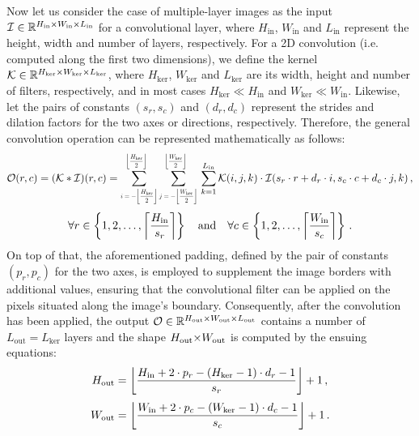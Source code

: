 Now let us consider the case of multiple-layer images as the input $\mathcal{I} \in \mathbb{R}^{H_{\text{in}} \stimes W_{\text{in}} \stimes L_{\text{in}}}$ for a convolutional layer, where $H_{\text{in}}$, $W_{\text{in}}$ and $L_{\text{in}}$ represent the height, width and number of layers, respectively. For a 2D convolution (i.e. computed along the first two dimensions), we define the kernel $\mathcal{K} \in \mathbb{R}^{H_{\text{ker}} \stimes W_{\text{ker}} \stimes L_{\text{ker}}}$, where $H_{\text{ker}}$, $W_{\text{ker}}$ and $L_{\text{ker}}$ are its width, height and number of filters, respectively, and in most cases $H_{\text{ker}} \ll H_{\text{in}}$ and $W_{\text{ker}} \ll W_{\text{in}}$. Likewise, let the pairs of constants $(s_r, s_c)$ and $(d_r, d_c)$ represent the strides and dilation factors for the two axes or directions, respectively. Therefore, the general convolution operation can be represented mathematically as follows:
\begin{equation}
    \mathcal{O}(r, c) = \left( \mathcal{K} \ast \mathcal{I} \right)\!(r, c) =
    \sum\limits_{ \scalemath{\convscale}{ i=-\floor*{\dfrac{H_{\text{ker}}}{2}} } }^{ \scalemath{\convscale}{ \floor*{\dfrac{H_{\text{ker}}}{2}} } }
    \sum\limits_{ \scalemath{\convscale}{ j=-\floor*{\dfrac{W_{\text{ker}}}{2}} } }^{ \scalemath{\convscale}{ \floor*{\dfrac{W_{\text{ker}}}{2}} } } \,
    \sum\limits_{k=1}^{L_{\text{in}}}
    \mathcal{K}(i,j,k) \cdot  \mathcal{I}(s_r \cdot r + d_r \cdot i, s_c \cdot c + d_c \cdot j, k) \,,
\end{equation}
\begin{equation}
    \forall r \in \left\{ 1, 2, \ldots, \ceil*{\dfrac{H_{\text{in}}}{s_r}} \right\}
    \quad \text{and} \quad
    \forall c \in \left\{ 1, 2, \ldots, \ceil*{\dfrac{W_{\text{in}}}{s_c}} \right\} \,. \label{eq:conv-index}
\end{equation}
\noindent On top of that, the aforementioned padding, defined by the pair of constants $(p_r, p_c)$ for the two axes, is employed to supplement the image borders with additional values, ensuring that the convolutional filter can be applied on the pixels situated along the image's boundary. Consequently, after the convolution has been applied, the output $\mathcal{O} \in \mathbb{R}^{ H_{\text{out}} \stimes W_{\text{out}} \stimes L_{\text{out}} }$ contains a number of $L_{\text{out}} = L_{\text{ker}}$ layers and the shape $H_{\text{out}} \stimes W_{\text{out}}$ is computed by the ensuing equations:
\begin{equation}
    H_{\text{out}} = \floor*{\dfrac{ H_{\text{in}} + 2 \cdot p_r - (H_{\text{ker}} - 1) \cdot d_r - 1 }{ s_r } } + 1 \,,
\end{equation}
\begin{equation}
    W_{\text{out}} = \floor*{\dfrac{ W_{\text{in}} + 2 \cdot p_c - (W_{\text{ker}} - 1) \cdot d_c - 1 }{ s_c } } + 1 \,.
\end{equation}

